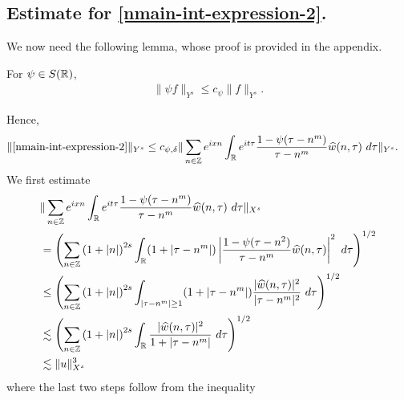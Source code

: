 \subsection{Estimate for
\texorpdfstring{\eqref{nmain-int-expression-2}}{Expression 2}.}
We now need the following lemma, whose proof is provided in the appendix.
%
%
%
%
%
%
%
%
\begin{lemma}
\label{nlem:schwartz-mult}
	For $\psi \in S(\mathbb{R})$,
%
%
\begin{equation}
	\label{nschwartz-mult}
	\begin{split}
		\|\psi f \|_{Y^s} \le c_{\psi} \|f \|_{Y^s}.
	\end{split}
\end{equation}
%
%
\end{lemma}
%
%
Hence,
%
%
\begin{equation}
  \label{nyu}
	\begin{split}
		\|\eqref{nmain-int-expression-2}\|_{Y^s} 
    & \le c_{\psi, \delta}
		\| \sum_{n \in \zz} e^{ixn} \int_\rr 
		e^{it \tau} \frac{ 1 - \psi (\tau - n^{m} ) 
		}{\tau - n^{m}} \wh{w}(n, \tau) \ 
		d \tau\|_{Y^s}.
			\end{split}
\end{equation}
%
We first estimate
%
%
\begin{equation}
\label{nmain-int2-est-X-s-part}
\begin{split}
  & \| \sum_{n \in \zz} e^{ixn} \int_\rr 
		e^{it \tau} \frac{ 1 - \psi (\tau - n^{m} ) 
		}{\tau - n^{m}} \wh{w}(n, \tau) \ 
		d \tau\|_{X^s}
		\\
    & = \left( \sum_{n \in \zz} \left (1 + |n| \right )^{2s} \int_\rr
		(1 + |\tau - n^{m}|) \left | \frac{1 - \psi(\tau - n^{2 
		})}{\tau - n^{m}} 
		\wh{w}(n, \tau) \right |^2 \ d 
		\tau \right)^{1/2}
		\\
		& \le \left( \sum_{n \in \zz} \left (1 + |n| \right )^{2s} \int_{| \tau - n^{m }| \ge 1}
		(1 + |\tau - n^{m}|) \frac{|\wh{w}(n, \tau)|^2 }{|\tau - n^{m }|^2} 
		\ d 
		\tau \right)^{1/2}
		\\
		& \lesssim  \left( \sum_{n \in 
		\zz} \left (1 + |n| \right )^{2s} \int_\rr
		\frac{|\wh{w}(n, \tau) |^2}{1+ |\tau - 
		n^{m}|} 
		 \ d \tau 
		\right)^{1/2}
		\\
		& \lesssim  \|u\|_{X^s}^3
\end{split}
\end{equation}
%
%
%
where the last two steps follow from the inequality 
